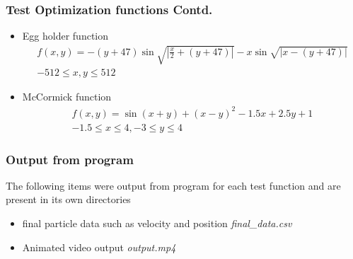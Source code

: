 \begin{frame}
    \frametitle{Test Optimization functions Contd. }
    \tiny
    \begin{itemize}
        \item Egg holder function
            \begin{align*}
                f(x,y) = -(y+47)\sin\sqrt{|\frac{x}{2} + (y+47)|} - x\sin\sqrt{|x-(y+47)|} \\
                -512 \le x,y \le 512
            \end{align*}
        \item McCormick function
            \begin{align*}
                f(x,y) = \sin(x+y) + (x-y)^2 -1.5 x + 2.5 y + 1 \\
                -1.5 \le x \le 4, -3 \le y \le 4
            \end{align*}
    \end{itemize}
\end{frame}
\begin{frame}
    \frametitle{Output from program}
    The following items were output from program for each test function and
    are present in its own directories
            \vspace{1cm}
    \begin{itemize}
        \item final particle data such as velocity and position \textit{final\_data.csv}
            \vspace{1cm}
        \item Animated video output \textit{output.mp4}
    \end{itemize}
\end{frame}
